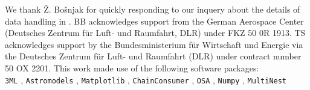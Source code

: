\documentclass{aa}
\begin{document}
\begin{acknowledgement}
We thank {\v{Z}}. Bo{\v{s}}njak for quickly responding to our inquery about the details of data handling in \citet{Bosnjak-2014}. BB acknowledges support from the German Aerospace Center (Deutsches Zentrum f\"ur Luft- und Raumfahrt, DLR) under FKZ 50 0R 1913. TS acknowledges support by the Bundesministerium f\"ur Wirtschaft und Energie via the Deutsches Zentrum f\"ur Luft- und Raumfahrt (DLR) under contract number 50 OX 2201.
This work made use of the following software packages:\\
{\tt 3ML} \citep{3ML}, {\tt Astromodels} \citep{astromodels}, {\tt Matplotlib} \citep{matplotlib}, {\tt ChainConsumer} \citep{chainconsumer, chainconsumer2}, {\tt OSA} \citep{osa}, {\tt Numpy} \citep{numpy}, {\tt MultiNest} \citep{multinest, multinest1, multinest3}
\end{acknowledgement}



\end{document}
